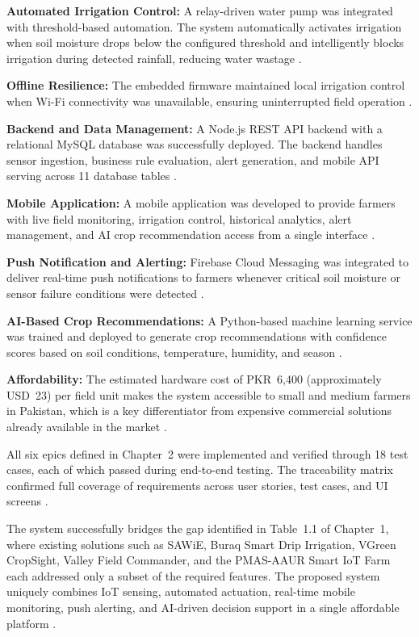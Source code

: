 \textbf{Automated Irrigation Control:} A relay-driven water pump was integrated with threshold-based automation. The system automatically activates irrigation when soil moisture drops below the configured threshold and intelligently blocks irrigation during detected rainfall, reducing water wastage \cite{garcia2020iot}.

\textbf{Offline Resilience:} The embedded firmware maintained local irrigation control when Wi-Fi connectivity was unavailable, ensuring uninterrupted field operation \cite{hassebo2024esp32}.

\textbf{Backend and Data Management:} A Node.js REST API backend with a relational MySQL database was successfully deployed. The backend handles sensor ingestion, business rule evaluation, alert generation, and mobile API serving across 11 database tables \cite{thilakarathne2023fields}.

\textbf{Mobile Application:} A mobile application was developed to provide farmers with live field monitoring, irrigation control, historical analytics, alert management, and AI crop recommendation access from a single interface \cite{mobileui2022}.

\textbf{Push Notification and Alerting:} Firebase Cloud Messaging was integrated to deliver real-time push notifications to farmers whenever critical soil moisture or sensor failure conditions were detected \cite{khawas2018firebase}.

\textbf{AI-Based Crop Recommendations:} A Python-based machine learning service was trained and deployed to generate crop recommendations with confidence scores based on soil conditions, temperature, humidity, and season \cite{musanase2023data}.

\textbf{Affordability:} The estimated hardware cost of PKR~6,400 (approximately USD~23) per field unit makes the system accessible to small and medium farmers in Pakistan, which is a key differentiator from expensive commercial solutions already available in the market \cite{zia2021experimental}.



All six epics defined in Chapter~2 were implemented and verified 
through 18 test cases, each of which passed during end-to-end 
testing. The traceability matrix confirmed full coverage of 
requirements across user stories, test cases, and UI screens 
\cite{tahir2019traceability}.

The system successfully bridges the gap identified in Table~1.1 
of Chapter~1, where existing solutions such as SAWiE, Buraq Smart 
Drip Irrigation, VGreen CropSight, Valley Field Commander, and 
the PMAS-AAUR Smart IoT Farm each addressed only a subset of the 
required features. The proposed system uniquely combines IoT 
sensing, automated actuation, real-time mobile monitoring, 
push alerting, and AI-driven decision support in a single 
affordable platform \cite{khanna2019evolution}.

